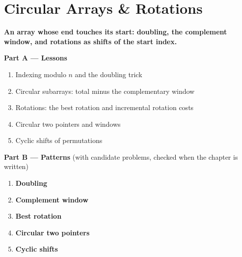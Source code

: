 \chapter{Circular Arrays \& Rotations}
\label{ch:circular}

\begin{tcolorbox}[enhanced, colback=white, colframe=secondaryblue, boxrule=1pt, arc=2mm]
\textbf{\large\textcolor{primaryblue}{An array whose end touches its start: doubling, the complement window, and rotations as shifts of the start index.}}
\end{tcolorbox}


\begin{plannedbox}
\textbf{Part A --- Lessons}
\begin{enumerate}[leftmargin=*, label=\textbf{A\arabic*.}, itemsep=1pt]
    \item Indexing modulo $n$ and the doubling trick
    \item Circular subarrays: total minus the complementary window
    \item Rotations: the best rotation and incremental rotation costs
    \item Circular two pointers and windows
    \item Cyclic shifts of permutations
\end{enumerate}
\textbf{Part B --- Patterns} (with candidate problems, checked when the chapter is written)
\begin{enumerate}[leftmargin=*, label=\textbf{P\arabic*.}, itemsep=1pt]
    \item \textbf{Doubling}
    \item \textbf{Complement window}
    \item \textbf{Best rotation}
    \item \textbf{Circular two pointers}
    \item \textbf{Cyclic shifts}
\end{enumerate}
\end{plannedbox}
